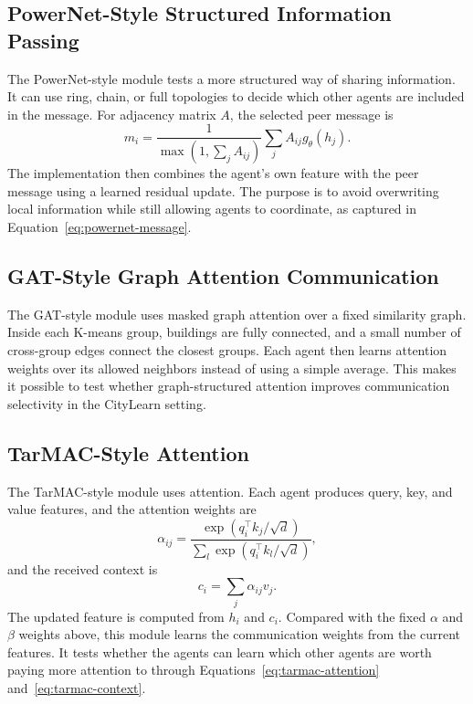 \subsection{PowerNet-Style Structured Information Passing}

The PowerNet-style module tests a more structured way of sharing information. It
can use ring, chain, or full topologies to decide which other agents are included
in the message. For adjacency matrix $A$, the selected peer message is
\begin{equation}
\label{eq:powernet-message}
m_i = \frac{1}{\max(1,\sum_j A_{ij})}\sum_j A_{ij}g_\theta(h_j).
\end{equation}
The implementation then combines the agent's own feature with the peer message
using a learned residual update. The purpose is to avoid overwriting local
information while still allowing agents to coordinate, as captured in
Equation~\eqref{eq:powernet-message}.

\subsection{GAT-Style Graph Attention Communication}

The GAT-style module uses masked graph attention over a fixed similarity graph.
Inside each K-means group, buildings are fully connected, and a small number of
cross-group edges connect the closest groups. Each agent then learns attention
weights over its allowed neighbors instead of using a simple average. This makes
it possible to test whether graph-structured attention improves communication
selectivity in the CityLearn setting.

\subsection{TarMAC-Style Attention}

The TarMAC-style module uses attention. Each agent produces query, key, and
value features, and the attention weights are
\begin{equation}
\label{eq:tarmac-attention}
\alpha_{ij} =
\frac{\exp(q_i^\top k_j / \sqrt{d})}
{\sum_l \exp(q_i^\top k_l / \sqrt{d})},
\end{equation}
and the received context is
\begin{equation}
\label{eq:tarmac-context}
c_i = \sum_j \alpha_{ij}v_j .
\end{equation}
The updated feature is computed from $h_i$ and $c_i$. Compared with the fixed
$\alpha$ and $\beta$ weights above, this module learns the communication weights
from the current features. It tests whether the agents can learn which other
agents are worth paying more attention to through
Equations~\eqref{eq:tarmac-attention} and~\eqref{eq:tarmac-context}.


